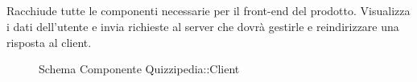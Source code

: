 \subsection{}
Racchiude tutte le componenti necessarie per il front-end del prodotto. Visualizza i dati dell'utente e invia richieste al server che dovrà gestirle e reindirizzare una risposta al client.
\begin{figure}[H]
\centering
\noindent{}
\caption[Schema Componente Client]{Schema Componente Quizzipedia::Client}
\end{figure}
